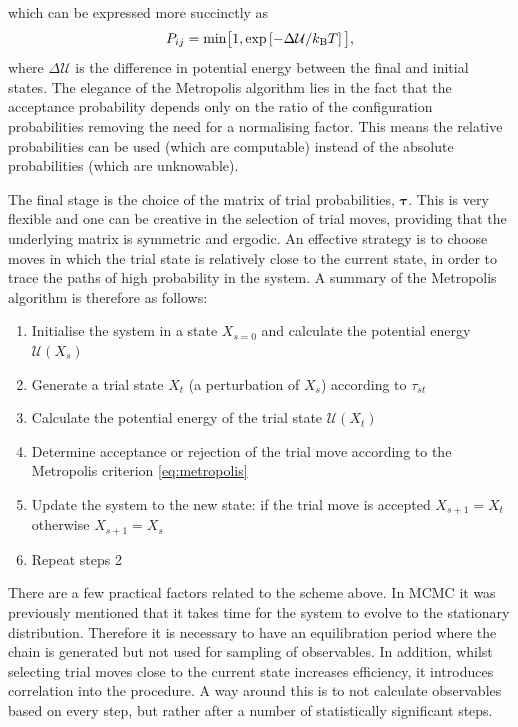 which can be expressed more succinctly as
\begin{equation}
	\label{eq:metropolis}
	 P_{ij}=\text{min}\big[1,\exp\left[-\Delta \mathcal{U}/k_\text{B} T\right]\big],
\end{equation}
where $\Delta \mathcal{U}$ is the difference in potential energy between the final and initial states.
The elegance of the Metropolis algorithm lies in the fact that the acceptance probability depends only on the ratio of the configuration probabilities removing the need for a normalising factor.
This means the relative probabilities can be used (which are computable) instead of the absolute probabilities (which are unknowable).

The final stage is the choice of the matrix of trial probabilities, $\bm{\tau}$. 
This is very flexible and one can be creative in the selection of trial moves, providing that the underlying matrix is symmetric and ergodic.
An effective strategy is to choose moves in which the trial state is relatively close to the current state, in order to trace the paths of high probability in the system.
A summary of the Metropolis algorithm is therefore as follows:
\begin{enumerate}
	\item Initialise the system in a state $X_{s=0}$ and calculate the potential energy $\mathcal{U}\left(X_s\right)$
	\item Generate a trial state $X_t$ (a perturbation of $X_s$) according to $\tau_{st}$
	\item Calculate the potential energy of the trial state $\mathcal{U}\left(X_t\right)$
	\item Determine acceptance or rejection of the trial move according to the Metropolis criterion \eqref{eq:metropolis}
	\item Update the system to the new state: if the trial move is accepted $X_{s+1}=X_{t}$ otherwise $X_{s+1}=X_{s}$
	\item Repeat steps 2
\end{enumerate}
There are a few practical factors related to the scheme above.
In MCMC it was previously mentioned that it takes time for the system to evolve to the stationary distribution.
Therefore it is necessary to have an equilibration period where the chain is generated but not used for sampling of observables.
In addition, whilst selecting trial moves close to the current state increases efficiency, it introduces correlation into the procedure.
A way around this is to not calculate observables based on every step, but rather after a number of statistically significant steps.

